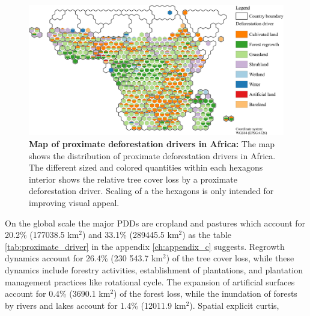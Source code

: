 			\begin{figure}[ht]
				\centering
				\includegraphics[scale=1]{img/africa_driver_frameless}
				\caption[Map of proximate deforestion drivers in Africa]{\textbf{Map of proximate deforestation drivers in Africa:} The map shows the distribution of proximate deforestation drivers in Africa. The different sized and colored quantities within each hexagons interior shows the relative tree cover loss by a proximate deforestation driver. Scaling of a the hexagons is only intended for improving visual appeal.}
				\label{fig:africa_driver}
			\end{figure}

			On the global scale the major \acp{PDD} are cropland and pastures which account for 20.2\% (177038.5 km$^2$) and 33.1\% (289445.5 km$^2$) as the table \ref{tab:proximate_driver} in the appendix \ref{ch:appendix_c} suggests. Regrowth dynamics account for 26.4\% (230 543.7 km$^2$) of the tree cover loss, while these dynamics include forestry activities, establishment of plantations, and plantation management practices like rotational cycle. The expansion of artificial surfaces account for 0.4\% (3690.1 km$^2$) of the forest loss, while the inundation of forests by rivers and lakes account for 1.4\% (12011.9 km$^2$). 
			Spatial explicit curtis, 

